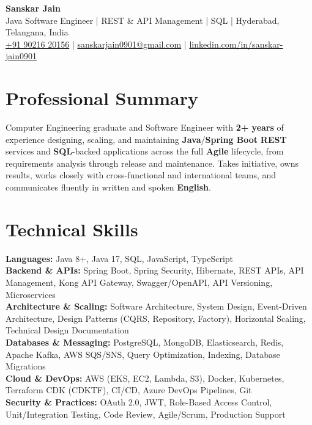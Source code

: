 \documentclass[a4paper,10pt]{article}
\begin{document}
\begin{center}
    {\LARGE \textbf{Sanskar Jain}} \\
    \vspace{2pt}
    Java Software Engineer \;|\; REST \& API Management \;|\; SQL \;|\; Hyderabad, Telangana, India \\
    \href{tel:+919021620156}{+91 90216 20156} \;|\;
    \href{mailto:sanskarjain0901@gmail.com}{sanskarjain0901@gmail.com} \;|\;
    \href{https://www.linkedin.com/in/sanskar-jain0901/}{linkedin.com/in/sanskar-jain0901}
\end{center}

\section*{Professional Summary}
Computer Engineering graduate and Software Engineer with \textbf{2+ years} of experience designing, scaling, and maintaining \textbf{Java}/\textbf{Spring Boot} \textbf{REST} services and \textbf{SQL}-backed applications across the full \textbf{Agile} lifecycle, from requirements analysis through release and maintenance.
Takes initiative, owns results, works closely with cross-functional and international teams, and communicates fluently in written and spoken \textbf{English}.

\section*{Technical Skills}
\begin{sloppypar}
\noindent
\textbf{Languages:} Java 8+, Java 17, SQL, JavaScript, TypeScript \\
\textbf{Backend \& APIs:} Spring Boot, Spring Security, Hibernate, REST APIs, API Management, Kong API Gateway, Swagger/OpenAPI, API Versioning, Microservices \\
\textbf{Architecture \& Scaling:} Software Architecture, System Design, Event-Driven Architecture, Design Patterns (CQRS, Repository, Factory), Horizontal Scaling, Technical Design Documentation \\
\textbf{Databases \& Messaging:} PostgreSQL, MongoDB, Elasticsearch, Redis, Apache Kafka, AWS SQS/SNS, Query Optimization, Indexing, Database Migrations \\
\textbf{Cloud \& DevOps:} AWS (EKS, EC2, Lambda, S3), Docker, Kubernetes, Terraform CDK (CDKTF), CI/CD, Azure DevOps Pipelines, Git \\
\textbf{Security \& Practices:} OAuth 2.0, JWT, Role-Based Access Control, Unit/Integration Testing, Code Review, Agile/Scrum, Production Support
\end{sloppypar}
\end{document}
